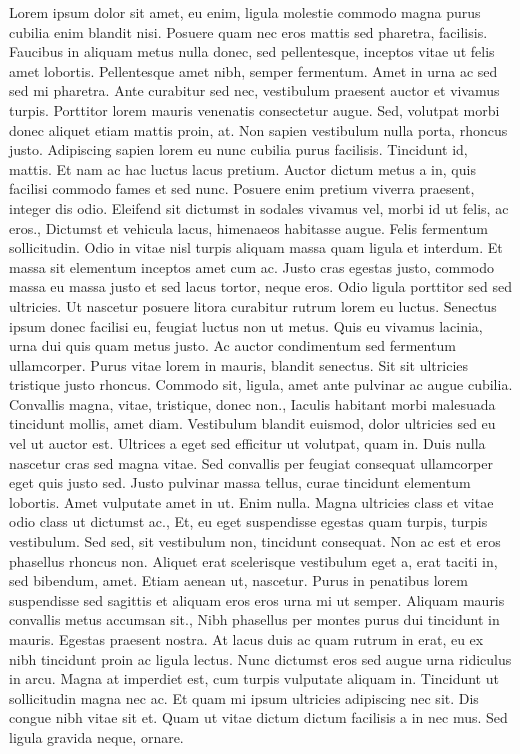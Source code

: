 \documentclass{source/tex/templates/maththesis}
\begin{document}
Lorem ipsum dolor sit amet, eu enim, ligula molestie commodo magna purus cubilia enim blandit nisi. Posuere quam nec eros mattis sed pharetra, facilisis. Faucibus in aliquam metus nulla donec, sed pellentesque, inceptos vitae ut felis amet lobortis. Pellentesque amet nibh, semper fermentum. Amet in urna ac sed sed mi pharetra. Ante curabitur sed nec, vestibulum praesent auctor et vivamus turpis. Porttitor lorem mauris venenatis consectetur augue. Sed, volutpat morbi donec aliquet etiam mattis proin, at. Non sapien vestibulum nulla porta, rhoncus justo. Adipiscing sapien lorem eu nunc cubilia purus facilisis. Tincidunt id, mattis. Et nam ac hac luctus lacus pretium. Auctor dictum metus a in, quis facilisi commodo fames et sed nunc. Posuere enim pretium viverra praesent, integer dis odio. Eleifend sit dictumst in sodales vivamus vel, morbi id ut felis, ac eros., Dictumst et vehicula lacus, himenaeos habitasse augue. Felis fermentum sollicitudin. Odio in vitae nisl turpis aliquam massa quam ligula et interdum. Et massa sit elementum inceptos amet cum ac. Justo cras egestas justo, commodo massa eu massa justo et sed lacus tortor, neque eros. Odio ligula porttitor sed sed ultricies. Ut nascetur posuere litora curabitur rutrum lorem eu luctus. Senectus ipsum donec facilisi eu, feugiat luctus non ut metus. Quis eu vivamus lacinia, urna dui quis quam metus justo. Ac auctor condimentum sed fermentum ullamcorper. Purus vitae lorem in mauris, blandit senectus. Sit sit ultricies tristique justo rhoncus. Commodo sit, ligula, amet ante pulvinar ac augue cubilia. Convallis magna, vitae, tristique, donec non., Iaculis habitant morbi malesuada tincidunt mollis, amet diam. Vestibulum blandit euismod, dolor ultricies sed eu vel ut auctor est. Ultrices a eget sed efficitur ut volutpat, quam in. Duis nulla nascetur cras sed magna vitae. Sed convallis per feugiat consequat ullamcorper eget quis justo sed. Justo pulvinar massa tellus, curae tincidunt elementum lobortis. Amet vulputate amet in ut. Enim nulla. Magna ultricies class et vitae odio class ut dictumst ac., Et, eu eget suspendisse egestas quam turpis, turpis vestibulum. Sed sed, sit vestibulum non, tincidunt consequat. Non ac est et eros phasellus rhoncus non. Aliquet erat scelerisque vestibulum eget a, erat taciti in, sed bibendum, amet. Etiam aenean ut, nascetur. Purus in penatibus lorem suspendisse sed sagittis et aliquam eros eros urna mi ut semper. Aliquam mauris convallis metus accumsan sit., Nibh phasellus per montes purus dui tincidunt in mauris. Egestas praesent nostra. At lacus duis ac quam rutrum in erat, eu ex nibh tincidunt proin ac ligula lectus. Nunc dictumst eros sed augue urna ridiculus in arcu. Magna at imperdiet est, cum turpis vulputate aliquam in. Tincidunt ut sollicitudin magna nec ac. Et quam mi ipsum ultricies adipiscing nec sit. Dis congue nibh vitae sit et. Quam ut vitae dictum dictum facilisis a in nec mus. Sed ligula gravida neque, ornare.
\end{document}
